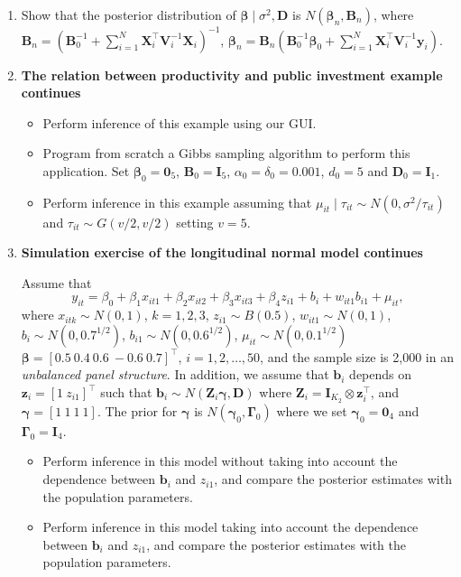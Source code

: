 \begin{enumerate}
	
	\item Show that the posterior distribution of $\bm{\beta}\mid \sigma^2,\bm{D}$ is $N(\bm{\beta}_n,\bm{B}_n)$, where $\bm{B}_n = (\bm{B}_0^{-1} +\sum_{i=1}^N \bm{X}_i^{\top}\bm{V}_i^{-1}\bm{X}_i)^{-1}$, $\bm{\beta}_n= \bm{B}_n(\bm{B}_0^{-1}\bm{\beta}_0 + \sum_{i=1}^N\bm{X}_i^{\top}\bm{V}_i^{-1}\bm{y}_i)$.
	
	\item \textbf{The relation between productivity and public investment example continues}
	
	\begin{itemize}
		\item Perform inference of this example using our GUI.
		\item Program from scratch a Gibbs sampling algorithm to perform this application. Set $\bm{\beta}_0=\bm{0}_5$, $\bm{B}_0=\bm{I}_5$, $\alpha_0=\delta_0=0.001$, $d_0=5$ and $\bm{D}_0=\bm{I}_1$.
		\item Perform inference in this example assuming that $\mu_{it}\mid \tau_{it}\sim N(0, \sigma^2/\tau_{it})$ and $\tau_{it}\sim G(v/2,v/2)$ setting $v=5$. 
	\end{itemize}
  
	\item \textbf{Simulation exercise of the longitudinal normal model continues}
	
	
	Assume that 
	\[y_{it}=\beta_0+\beta_1x_{it1}+\beta_2x_{it2}+\beta_3x_{it3}+\beta_4 z_{i1}+b_i+w_{it1}b_{i1}+\mu_{it},\]
	where $x_{itk}\sim N(0,1)$, $k=1,2,3$, $z_{i1}\sim B(0.5)$, $w_{it1}\sim N(0,1)$, $b_i\sim N(0, 0.7^{1/2})$, $b_{i1}\sim N(0, 0.6^{1/2})$, $\mu_{it}\sim N(0, 0.1^{1/2})$ $\bm{\beta}=[0.5 \ 0.4 \ 0.6 \ -0.6 \ 0.7]^{\top}$, $i=1,2,\dots,50$, and the sample size is 2,000 in an \textit{unbalanced panel structure}. In addition, we assume that $\bm{b}_i$ depends on $\bm{z}_i=[1 \ z_{i1}]^{\top}$ such that $\bm{b}_i\sim N(\bm{Z}_i\bm{\gamma},\bm{D})$ where $\bm{Z}_i=\bm{I}_{K_2}\otimes \bm{z}_i^{\top}$, and $\bm{\gamma}=[1 \ 1 \ 1 \ 1]$. The prior for $\bm{\gamma}$ is $N(\bm{\gamma}_0,\bm{\Gamma}_0)$ where we set $\bm{\gamma}_0=\bm{0}_4$ and $\bm{\Gamma}_0=\bm{I}_4$. 
	
	\begin{itemize}
		\item Perform inference in this model without taking into account the dependence between $\bm{b}_i$ and $z_{i1}$, and compare the posterior estimates with the population parameters.
		\item Perform inference in this model taking into account the dependence between $\bm{b}_i$ and $z_{i1}$, and compare the posterior estimates with the population parameters. 
	\end{itemize}


\end{enumerate}

